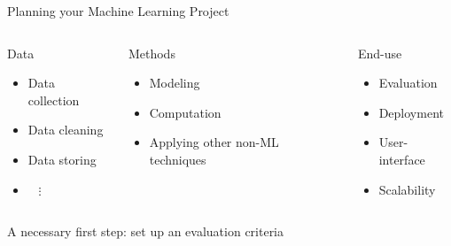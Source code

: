 \documentclass[aspectratio=169,xcolor=dvipsnames,svgnames,x11names,fleqn]{beamer}
\begin{document}
\begin{frame}{Planning your Machine Learning Project}

\begin{columns}

\begin{tblock}{Data}
\begin{itemize}
\item Data collection
\item Data cleaning
\item Data storing 
\item ~ $\vdots$
\end{itemize}
\end{tblock}




\begin{tblock}{Methods}

\begin{itemize}
\item Modeling
\item Computation
\item Applying other non-ML techniques
\end{itemize}

\end{tblock}





\begin{tblock}{End-use}
\begin{itemize}
\item Evaluation
\item Deployment
\item User-interface
\item Scalability
\end{itemize}

\end{tblock}



\end{columns}

\begin{texample}
A necessary first step: set up an evaluation criteria
\end{texample}

\end{frame}
\end{document}
